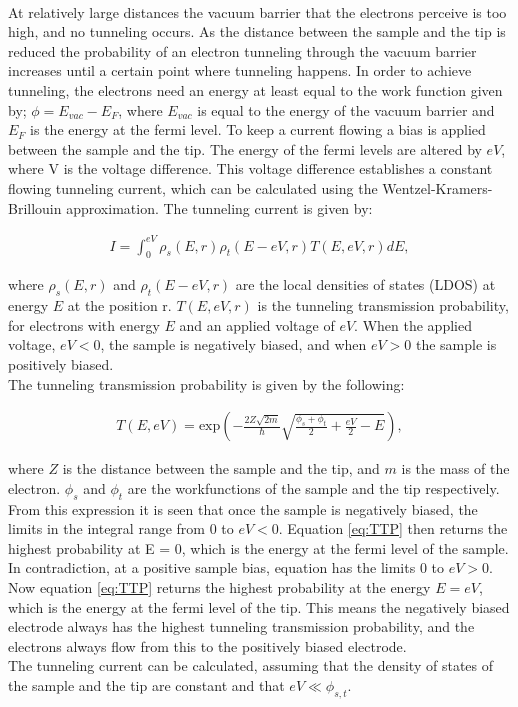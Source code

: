 \\
At relatively large distances the vacuum barrier that the electrons perceive is too high, and no tunneling occurs. As the distance between the sample and the tip is reduced the probability of an electron tunneling through the vacuum barrier increases until a certain point where tunneling happens. In order to achieve tunneling, the electrons need an energy at least equal to the work function given by; $\phi = E_{vac} - E_F$, where $E_{vac}$ is equal to the energy of the vacuum barrier and $E_F$ is the energy at the fermi level. To keep a current flowing a bias is applied between the sample and the tip. The energy of the fermi levels are altered by $eV$, where V is the voltage difference. This voltage difference establishes a constant flowing tunneling current, which can be calculated using the Wentzel-Kramers-Brillouin approximation. The tunneling current is given by:\cite{STMbog}

\begin{align}
  I = \int_0^{eV} \rho_s(E,r) \rho_t(E-eV,r)T(E,eV,r)dE,
  \label{eq:Iint}
\end{align}

where $\rho_s(E,r)$ and $\rho_t(E-eV,r)$ are the local densities of states (LDOS) at energy $E$ at the position r. $T(E,eV,r)$ is the tunneling transmission probability, for electrons with energy $E$ and an applied voltage of $eV$. When the applied voltage, $eV < 0$, the sample is negatively biased, and when $eV > 0$ the sample is positively biased.\\
The tunneling transmission probability is given by the following:\cite{STMbog}

\begin{align}
  T(E,eV) = \text{exp}\left( -\frac{2Z\sqrt{2m}}{\hbar} \sqrt{\frac{\phi_s + \phi_t}{2}+\frac{eV}{2}-E} \right),
  \label{eq:TTP}
\end{align}

where $Z$ is the distance between the sample and the tip, and $m$ is the mass of the electron. $\phi_s$ and $\phi_t$ are the workfunctions of the sample and the tip respectively. From this expression it is seen that once the sample is negatively biased, the limits in the integral range from 0 to $eV<0$. Equation \ref{eq:TTP} then returns the highest probability at E = 0, which is the energy at the fermi level of the sample. In contradiction, at a positive sample bias, equation \label{eq:Iint} has the limits 0 to $eV>0$. Now equation \ref{eq:TTP} returns the highest probability at the energy $E = eV$, which is the energy at the fermi level of the tip. This means the negatively biased electrode always has the highest tunneling transmission probability, and the electrons always flow from this to the positively biased electrode.\\
The tunneling current can be calculated, assuming that the density of states of the sample and the tip are constant and that $eV \ll \phi_{s,t}$.\cite{STMbog,PhysRevLett.49.57}


